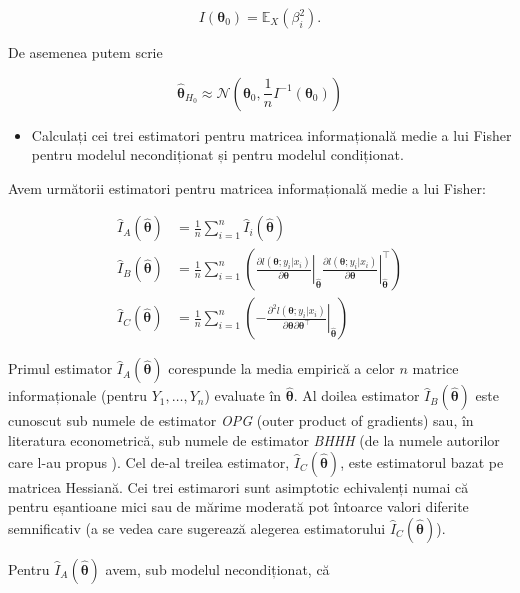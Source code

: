 \documentclass[]{article}
\newenvironment{frshaded*}{%
  \def\FrameCommand{\fboxrule=\FrameRule\fboxsep=\FrameSep \fcolorbox{framecolor}{shadecolor1}}%
  \MakeFramed {\advance\hsize-\width \FrameRestore}}%
{\endMakeFramed}
\newenvironment{rmdblock}[1]
  {\begin{frshaded*}
  \begin{itemize}
  \renewcommand{\labelitemi}{
    \raisebox{-.7\height}[0pt][0pt]{
      {\setkeys{Gin}{width=2em,keepaspectratio}\texttt{[image: images/icons/\#1]}}
    }
  }
  \item
  }
  {
  \end{itemize}
  \end{frshaded*}
  }
\newenvironment{rmdexercise}
  {\begin{rmdblock}{exercise}}
  {\end{rmdblock}}
\begin{document}
\[
I(\boldsymbol{\theta}_0) = \mathbb{E}_{X}(\beta_i^2).
\]

De asemenea putem scrie

\[
\hat{\boldsymbol{\theta}}_{H_0}\approx \mathcal{N}\left(\boldsymbol{\theta}_0, \frac{1}{n}I^{-1}(\boldsymbol{\theta}_0)\right)
\]

\begin{rmdexercise}
Calculați cei trei estimatori pentru matricea informațională medie a lui
Fisher pentru modelul necondiționat și pentru modelul condiționat.
\end{rmdexercise}

Avem următorii estimatori pentru matricea informațională medie a lui
Fisher:

\begin{align*}
  \hat{I}_{A}(\hat{\boldsymbol{\theta}}) &= \frac{1}{n}\sum_{i=1}^{n}\hat{I}_{i}(\hat{\boldsymbol{\theta}})\\
  \hat{I}_{B}(\hat{\boldsymbol{\theta}}) &= \frac{1}{n}\sum_{i=1}^{n}\left(\left.\frac{\partial l(\boldsymbol{\theta};y_i|x_i)}{\partial \boldsymbol{\theta}}\right\rvert_{\hat{\boldsymbol{\theta}}}\left.\frac{\partial l(\boldsymbol{\theta};y_i|x_i)}{\partial \boldsymbol{\theta}}\right\rvert_{\hat{\boldsymbol{\theta}}}^\intercal\right)\\
  \hat{I}_{C}(\hat{\boldsymbol{\theta}}) &= \frac{1}{n}\sum_{i=1}^{n}\left(-\left.\frac{\partial^2 l(\boldsymbol{\theta};y_i|x_i)}{\partial \boldsymbol{\theta}\partial \boldsymbol{\theta}^\intercal}\right\rvert_{\hat{\boldsymbol{\theta}}}\right)
\end{align*}

Primul estimator \(\hat{I}_{A}(\hat{\boldsymbol{\theta}})\) corespunde
la media empirică a celor \(n\) matrice informaționale (pentru
\(Y_1,\ldots, Y_n\)) evaluate în \(\hat{\boldsymbol{\theta}}\). Al
doilea estimator \(\hat{I}_{B}(\hat{\boldsymbol{\theta}})\) este
cunoscut sub numele de estimator \emph{OPG} (outer product of gradients)
sau, în literatura econometrică, sub numele de estimator \emph{BHHH} (de
la numele autorilor care l-au propus \citep{Berndt1974}). Cel de-al
treilea estimator, \(\hat{I}_{C}(\hat{\boldsymbol{\theta}})\), este
estimatorul bazat pe matricea Hessiană. Cei trei estimarori sunt
asimptotic echivalenți numai că pentru eșantioane mici sau de mărime
moderată pot întoarce valori diferite semnificativ (a se vedea
\citep{Greene2011} care sugerează alegerea estimatorului
\(\hat{I}_{C}(\hat{\boldsymbol{\theta}})\)).

Pentru \(\hat{I}_{A}(\hat{\boldsymbol{\theta}})\) avem, sub modelul
necondiționat, că
\end{document}
